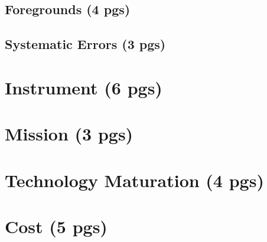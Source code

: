 \documentclass[12pt]{article}
\begin{document}
   \subsection{Foregrounds (4 pgs)}
   

   \subsection{Systematic Errors (3 pgs)}
   

\section{Instrument (6 pgs)}


\section{Mission (3 pgs)}


\section{Technology Maturation (4 pgs)}


\section{Cost (5 pgs)}


\newpage




\end{document}
